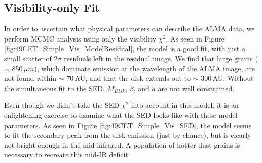  


\subsection{Visibility-only Fit}
\label{simple_VisOnly}

In order to ascertain what physical parameters can describe the ALMA data, we perform MCMC analysis using only the visibility $\chi^{2}$. As seen in Figure \ref{fig:49CET_Simple_Vis_ModelResidual}, the model is a good fit, with just a small scatter of 2$\sigma$ residuals left in the residual image. We find that large grains ($\sim$ 850$\,\mu m$), which dominate emission at the wavelength of the ALMA image, are not found within $\sim$ 70\,AU, and that the disk extends out to $\sim$ 300\,AU. Without the simultaneous fit to the SED, $M_{Disk}$, $\beta$, and $a$ are not well constrained.

Even though we didn't take the SED $\chi^{2}$ into account in this model, it is an enlightening exercise to examine what the SED looks like with these model parameters. As seen in Figure \ref{fig:49CET_Simple_Vis_SED}, the model seems to fit the secondary peak from the disk emission (just by chance), but is clearly not bright enough in the mid-infrared. A population of hotter dust grains is necessary to recreate this mid-IR deficit. 

